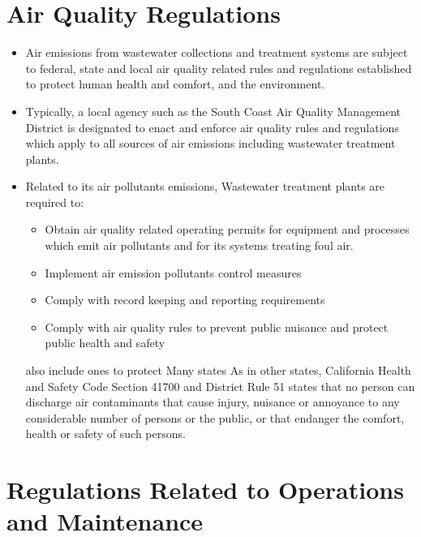 \section{Air Quality Regulations}
\begin{itemize}
\item Air emissions from wastewater collections and treatment systems are subject to federal, state and local air quality related rules and regulations established to protect human health and comfort, and the environment.  
\item Typically, a local agency such as the South Coast Air Quality Management District is designated to enact and enforce air quality rules and regulations which apply to all sources of air emissions including wastewater treatment plants.
  
\item Related to its air pollutants emissions, Wastewater treatment plants are required to:
\begin{itemize}
\item Obtain air quality related operating permits for equipment and processes which emit air pollutants and for its systems treating foul air.
\item Implement air emission pollutants control measures
\item Comply with record keeping and reporting requirements
\item Comply with air quality rules to prevent public nuisance and protect public health and safety
\end{itemize}

also include ones to protect Many states As in other states, California Health and Safety Code Section 41700 and District Rule 51 states that no person can discharge air contaminants that cause injury, nuisance or annoyance to any considerable number of persons or the public, or that endanger the comfort, health or safety of such persons.

\end{itemize}

\section{Regulations Related to Operations and Maintenance}
